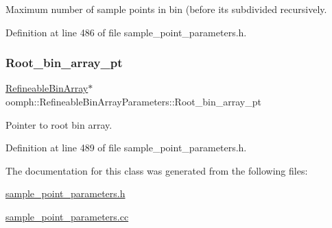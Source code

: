 Maximum number of sample points in bin (before its subdivided recursively. 



Definition at line 486 of file sample\+\_\+point\+\_\+parameters.\+h.

\mbox{\label{classoomph_1_1RefineableBinArrayParameters_ab4e2e5c03c4d3e725bd4f595b850bc2d}} 
\subsubsection{\texorpdfstring{Root\+\_\+bin\+\_\+array\+\_\+pt}{Root\_bin\_array\_pt}}
{\footnotesize\ttfamily \hyperlink{classRefineableBinArray}{Refineable\+Bin\+Array}$\ast$ oomph\+::\+Refineable\+Bin\+Array\+Parameters\+::\+Root\+\_\+bin\+\_\+array\+\_\+pt\hspace{0.3cm}{\ttfamily [private]}}



Pointer to root bin array. 



Definition at line 489 of file sample\+\_\+point\+\_\+parameters.\+h.



The documentation for this class was generated from the following files\+:\begin{DoxyCompactItemize}
\item 
\hyperlink{sample__point__parameters_8h}{sample\+\_\+point\+\_\+parameters.\+h}\item 
\hyperlink{sample__point__parameters_8cc}{sample\+\_\+point\+\_\+parameters.\+cc}\end{DoxyCompactItemize}
